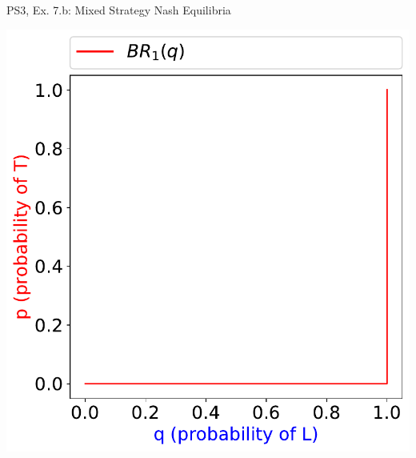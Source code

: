 \begin{frame}{PS3, Ex. 7.b: Mixed Strategy Nash Equilibria}
\begin{multicols}{2}
    \includegraphics[width=\columnwidth]{figures/5b1}
  \vfill\null
  \end{multicols}
\end{frame}
